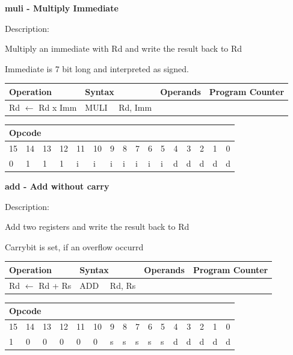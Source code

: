 \documentclass[%
	pdftex,
	a4paper,
	oneside,
	bibtotoc,%
	idxtotoc,%
	bibtotocnumbered,
	halfparskip,%
]{scrbook}
\begin{document}
\bigskip

\textbf{muli - Multiply Immediate}

Description:

Multiply an immediate with Rd and write the result back to Rd

Immediate is 7 bit long and interpreted as signed.

\begin{tabular}{|l|l|l|l|}
\hline
Operation & Syntax & Operands & Program Counter \\ \hline
Rd $\leftarrow $ Rd x Imm & MULI \ \ Rd, Imm &  &  \\ \hline
\end{tabular}

\begin{tabular}{|c|c|c|c|c|c|c|c|c|c|c|c|c|c|c|c|}
\hline
\multicolumn{6}{|l|}{Opcode} & \multicolumn{5}{|l|}{} & \multicolumn{5}{|l|}{
} \\ \hline
15 & 14 & 13 & 12 & 11 & 10 & 9 & 8 & 7 & 6 & 5 & 4 & 3 & 2 & 1 & 0 \\ \hline
\multicolumn{1}{|l|}{0} & \multicolumn{1}{|l|}{1} & \multicolumn{1}{|l|}{1}
& \multicolumn{1}{|l|}{1} & \multicolumn{1}{|l|}{i} & \multicolumn{1}{|l|}{i}
& \multicolumn{1}{|l|}{i} & \multicolumn{1}{|l|}{i} & \multicolumn{1}{|l|}{i}
& \multicolumn{1}{|l|}{i} & \multicolumn{1}{|l|}{i} & \multicolumn{1}{|l|}{d}
& \multicolumn{1}{|l|}{d} & \multicolumn{1}{|l|}{d} & \multicolumn{1}{|l|}{d}
& \multicolumn{1}{|l|}{d} \\ \hline
\end{tabular}

\bigskip

\textbf{add - Add without carry}

Description:

Add two registers and write the result back to Rd

Carrybit is set, if an overflow occurrd

\begin{tabular}{|l|l|l|l|}
\hline
Operation & Syntax & Operands & Program Counter \\ \hline
Rd $\leftarrow $ Rd + Rs & ADD \ \ Rd, Rs &  &  \\ \hline
\end{tabular}

\begin{tabular}{|c|c|c|c|c|c|c|c|c|c|c|c|c|c|c|c|}
\hline
\multicolumn{6}{|l|}{Opcode} & \multicolumn{5}{|l|}{} & \multicolumn{5}{|l|}{
} \\ \hline
15 & 14 & 13 & 12 & 11 & 10 & 9 & 8 & 7 & 6 & 5 & 4 & 3 & 2 & 1 & 0 \\ \hline
\multicolumn{1}{|l|}{1} & \multicolumn{1}{|l|}{0} & \multicolumn{1}{|l|}{0}
& \multicolumn{1}{|l|}{0} & \multicolumn{1}{|l|}{0} & \multicolumn{1}{|l|}{0}
& \multicolumn{1}{|l|}{s} & \multicolumn{1}{|l|}{s} & \multicolumn{1}{|l|}{s}
& \multicolumn{1}{|l|}{s} & \multicolumn{1}{|l|}{s} & \multicolumn{1}{|l|}{d}
& \multicolumn{1}{|l|}{d} & \multicolumn{1}{|l|}{d} & \multicolumn{1}{|l|}{d}
& \multicolumn{1}{|l|}{d} \\ \hline
\end{tabular}
\end{document}
